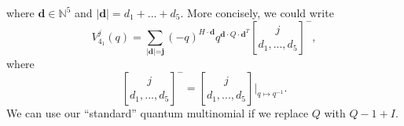 \documentclass[11pt]{amsart}
\theoremstyle{plain}
\theoremstyle{definition}
\theoremstyle{remark}
\begin{document}
where $\textbf{d}\in \mathbb{N}^5$ and $|\textbf{d}|=d_1+...+d_5$. More concisely, we could write
\[
V_{4_1}^j(q)=\sum_{|\textbf{d|=j}}(-q)^{H\cdot\textbf{d}}q^{\textbf{d}\cdot Q\cdot \textbf{d}^T}{j \brack d_1,...,d_5}^-,
\]
where 
\[
{j \brack d_1,...,d_5}^-={j \brack d_1,...,d_5}\bigg|_{q\mapsto q^{-1}}.
\]
We can use our ``standard'' quantum multinomial if we replace $Q$ with $Q-1+I$.

\end{document}

